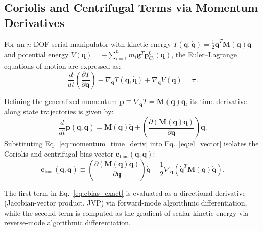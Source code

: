 \documentclass[fleqn,10pt]{article}
\begin{document}
	\subsection{Coriolis and Centrifugal Terms via Momentum Derivatives}
	\label{subsec:momentum_derivative}
	For an $n$-DOF serial manipulator with kinetic energy $T(\bm{q}, \dot{\bm{q}}) = \frac{1}{2}\dot{\bm{q}}^T\bm{M}(\bm{q})\dot{\bm{q}}$ and potential energy $V(\bm{q}) = -\sum_{i=1}^n m_i \bm{g}^T \bm{p}_{C_i}^0(\bm{q})$, the Euler--Lagrange equations of motion are expressed as:
	\begin{equation}
		\frac{d}{dt}\left(\frac{\partial T}{\partial \dot{\bm{q}}}\right) - \nabla_{\bm{q}} T(\bm{q}, \dot{\bm{q}}) + \nabla_{\bm{q}} V(\bm{q}) = \bm{\tau}.
		\label{eq:el_vector}
	\end{equation}
	
	Defining the generalized momentum $\bm{p} \equiv \nabla_{\dot{\bm{q}}} T = \bm{M}(\bm{q})\dot{\bm{q}}$, its time derivative along state trajectories is given by:
	\begin{equation}
		\frac{d}{dt}\bm{p}(\bm{q}, \dot{\bm{q}}) = \bm{M}(\bm{q})\ddot{\bm{q}} + \left(\frac{\partial (\bm{M}(\bm{q})\dot{\bm{q}})}{\partial \bm{q}}\right)\dot{\bm{q}}.
		\label{eq:momentum_time_deriv}
	\end{equation}
	Substituting Eq.~\eqref{eq:momentum_time_deriv} into Eq.~\eqref{eq:el_vector} isolates the Coriolis and centrifugal bias vector $\mathbf{c}_{\text{bias}}(\bm{q}, \dot{\bm{q}})$:
	\begin{equation}
		\mathbf{c}_{\text{bias}}(\bm{q}, \dot{\bm{q}}) \equiv \left(\frac{\partial (\bm{M}(\bm{q})\dot{\bm{q}})}{\partial \bm{q}}\right)\dot{\bm{q}} - \frac{1}{2}\nabla_{\bm{q}}\!\left(\dot{\bm{q}}^T \bm{M}(\bm{q})\dot{\bm{q}}\right).
		\label{eq:cbias_exact}
	\end{equation}
	
	The first term in Eq.~\eqref{eq:cbias_exact} is evaluated as a directional derivative (Jacobian-vector product, JVP) via forward-mode algorithmic differentiation, while the second term is computed as the gradient of scalar kinetic energy via reverse-mode algorithmic differentiation.
	
\end{document}

